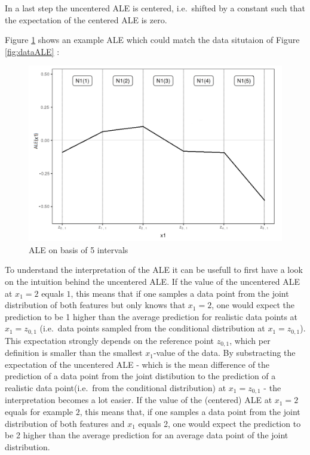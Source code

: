 \documentclass[
]{krantz}
\begin{document}
In a last step the uncentered ALE is centered, i.e.~shifted by a constant such that the expectation of the centered ALE is zero.

Figure \ref{fig:aleEx} shows an example ALE which could match the data situtaion of Figure \ref{fig:dataALE} :

\begin{figure}
\includegraphics[width=13.75in]{images/ale_example} \caption{ALE on basis of 5 intervals}\label{fig:aleEx}
\end{figure}



To understand the interpretation of the ALE it can be usefull to first have a look on the intuition behind the uncentered ALE.
If the value of the uncentered ALE at \(x_1 = 2\) equals \(1\), this means that if one samples a data point from the joint distribution of both features but only knows that \(x_1 = 2\), one would expect the prediction to be 1 higher than the average prediction for realistic data points at \(x_1 = z_{0,1}\) (i.e.~data points sampled from the conditional distribution at \(x_1 = z_{0,1}\)). This expectation strongly depends on the reference point \(z_{0,1}\), which per definition is smaller than the smallest \(x_1\)-value of the data.
By substracting the expectation of the uncentered ALE - which is the mean difference of the prediction of a data point from the joint distibution to the prediction of a realistic data point(i.e.~from the conditional distribution) at \(x_1 = z_{0,1}\) - the interpretation becomes a lot easier. If the value of the (centered) ALE at \(x_1 = 2\) equals for example \(2\), this means that, if one samples a data point from the joint distribution of both features and \(x_1\) equals 2, one would expect the prediction to be 2 higher than the average prediction for an average data point of the joint distribution.
\end{document}
